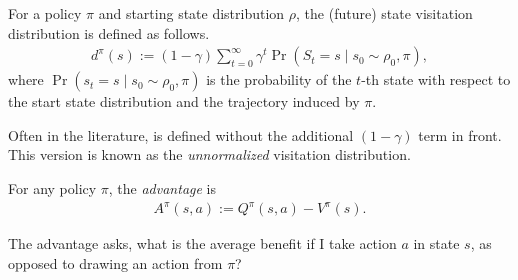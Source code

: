 \documentclass[\main/thesis.tex]{subfiles}
\begin{document}
\begin{definition}\label{def:d_pi}
For a policy $\pi$ and starting state distribution $\rho$, the (future) state visitation distribution is defined as follows.
\begin{align*}
    d^\pi(s) := (1 - \gamma) \sum_{t = 0}^\infty \gamma^t \Pr(S_t = s \mid s_0 \sim \rho_0, \pi),
\end{align*}
where $\Pr(s_t = s \mid s_0 \sim \rho_0, \pi)$ is the probability of the $t$-th state with respect to the start state distribution and the trajectory induced by $\pi$. 
\end{definition}
Often in the literature,  is defined without the additional $(1 - \gamma)$ term in front. This version is known as the \textit{unnormalized} visitation distribution.

\begin{definition}[Advantage]\label{def:advantage}
For any policy $\pi$, the \textit{advantage} is 
\begin{align*}
    A^\pi(s, a) := Q^\pi(s, a) - V^\pi(s).
\end{align*}
\end{definition}
The advantage asks, what is the average benefit if I take action $a$ in state $s$, as opposed to drawing an action from $\pi$?
\end{document}

